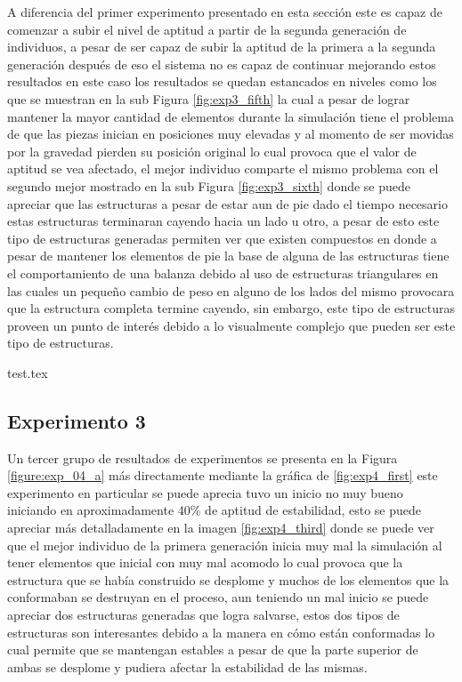 A diferencia del primer experimento presentado en esta sección este es capaz de
comenzar a subir el nivel de aptitud a partir de la segunda generación de
individuos, a pesar de ser capaz de subir la aptitud de la primera a la segunda
generación después de eso el sistema no es capaz de continuar mejorando estos
resultados en este caso los resultados se quedan estancados en niveles como los
que se muestran en la sub Figura \ref{fig:exp3_fifth} la cual a pesar de lograr
mantener la mayor cantidad de elementos durante la simulación tiene el problema
de que las piezas inician en posiciones muy elevadas y al momento de ser movidas
por la gravedad pierden su posición original lo cual provoca que el valor de
aptitud se vea afectado, el mejor individuo comparte el mismo problema con el
segundo mejor mostrado en la sub Figura \ref{fig:exp3_sixth} donde se puede
apreciar que las estructuras a pesar de estar aun de pie dado el tiempo
necesario estas estructuras terminaran cayendo hacia un lado u otro, a pesar de
esto este tipo de estructuras generadas permiten ver que existen compuestos en
donde a pesar de mantener los elementos de pie la base de alguna de las
estructuras tiene el comportamiento de una balanza debido al uso de estructuras
triangulares en las cuales un pequeño cambio de peso en alguno de los lados del
mismo provocara que la estructura completa termine cayendo, sin embargo, este
tipo de estructuras proveen un punto de interés debido a lo visualmente
complejo que pueden ser este tipo de estructuras.

{test.tex}

\newpage

\subsection{Experimento 3}
\label{chap6:exp_3}

Un tercer grupo de resultados de experimentos se presenta en la Figura
\ref{figure:exp_04_a} más directamente mediante la gráfica de
\ref{fig:exp4_first} este experimento en particular se puede aprecia tuvo un
inicio no muy bueno iniciando en aproximadamente 40\% de aptitud de estabilidad,
esto se puede apreciar más detalladamente en la imagen \ref{fig:exp4_third}
donde se puede ver que el mejor individuo de la primera generación inicia muy
mal la simulación al tener elementos que inicial con muy mal acomodo lo cual
provoca que la estructura que se había construido se desplome y muchos de los
elementos que la conformaban se destruyan en el proceso, aun teniendo un mal
inicio se puede apreciar dos estructuras generadas que logra salvarse, estos dos
tipos de estructuras son interesantes debido a la manera en cómo están
conformadas lo cual permite que se mantengan estables a pesar de que la parte
superior de ambas se desplome y pudiera afectar la estabilidad de las mismas. 

